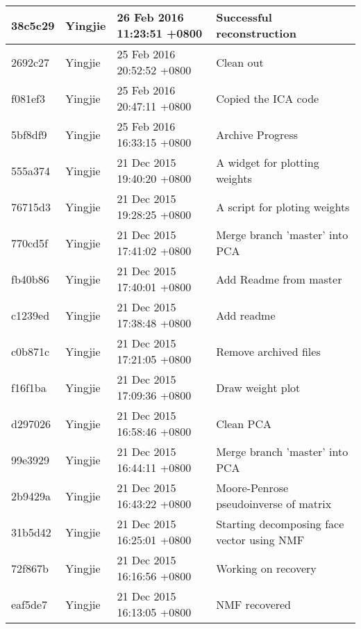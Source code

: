 \begin{longtable}{@{\extracolsep{\fill}}l|l|l|l@{}}
    38c5c29  & Yingjie &  26 Feb 2016 11:23:51 +0800 & Successful reconstruction                            \\ \hline
    2692c27  & Yingjie &  25 Feb 2016 20:52:52 +0800 & Clean out                                            \\ \hline
    f081ef3  & Yingjie &  25 Feb 2016 20:47:11 +0800 & Copied the ICA code                                  \\ \hline
    5bf8df9  & Yingjie &  25 Feb 2016 16:33:15 +0800 & Archive Progress                                     \\ \hline
    555a374  & Yingjie &  21 Dec 2015 19:40:20 +0800 & A widget for plotting weights                        \\ \hline
    76715d3  & Yingjie &  21 Dec 2015 19:28:25 +0800 & A script for ploting weights                         \\ \hline
    770cd5f  & Yingjie &  21 Dec 2015 17:41:02 +0800 & Merge branch 'master' into PCA                       \\ \hline
    fb40b86  & Yingjie &  21 Dec 2015 17:40:01 +0800 & Add Readme from master                               \\ \hline
    c1239ed  & Yingjie &  21 Dec 2015 17:38:48 +0800 & Add readme                                           \\ \hline
    c0b871c  & Yingjie &  21 Dec 2015 17:21:05 +0800 & Remove archived files                                \\ \hline
    f16f1ba  & Yingjie &  21 Dec 2015 17:09:36 +0800 & Draw weight plot                                     \\ \hline
    d297026  & Yingjie &  21 Dec 2015 16:58:46 +0800 & Clean PCA                                            \\ \hline
    99e3929  & Yingjie &  21 Dec 2015 16:44:11 +0800 & Merge branch 'master' into PCA                       \\ \hline
    2b9429a  & Yingjie &  21 Dec 2015 16:43:22 +0800 & Moore-Penrose pseudoinverse of matrix                \\ \hline
    31b5d42  & Yingjie &  21 Dec 2015 16:25:01 +0800 & Starting decomposing face vector using NMF           \\ \hline
    72f867b  & Yingjie &  21 Dec 2015 16:16:56 +0800 & Working on recovery                                  \\ \hline
    eaf5de7  & Yingjie &  21 Dec 2015 16:13:05 +0800 & NMF recovered                                        \\ \hline

\end{longtable}
